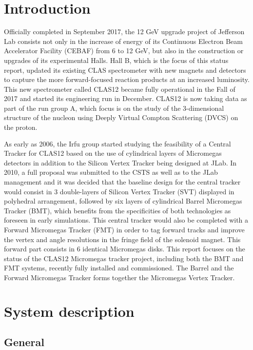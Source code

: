 \section{Introduction}
Officially completed in September 2017, the 12 GeV upgrade project of Jefferson Lab consists not only in the increase of energy of its Continuous Electron Beam Accelerator Facility (CEBAF) from 6 to 12 GeV, but also in the construction or upgrades of its experimental Halls. Hall B, which is the focus of this status report, updated its existing CLAS spectrometer with new magnets and detectors to capture the more forward-focused reaction products at an increased luminosity. This new spectrometer called CLAS12 became fully operational in the Fall of 2017 and started its engineering run in December. CLAS12 is now taking data as part of the run group A, which focus is on the study of the 3-dimensional structure of the nucleon using Deeply Virtual Compton Scattering (DVCS) on the proton.

As early as 2006, the Irfu group started studying the feasibility of a Central Tracker for CLAS12 based on the use of cylindrical layers of Micromegas detectors in addition to the Silicon Vertex Tracker being designed at JLab. In 2010, a full proposal was submitted to the CSTS as well as to the JLab management and it was decided that the baseline design for the central tracker would consist in 3 double-layers of Silicon Vertex Tracker (SVT) displayed in polyhedral arrangement, followed by six layers of cylindrical Barrel Micromegas Tracker (BMT), which benefits from the specificities of both technologies as foreseen in early simulations. This central tracker would also be completed with a Forward Micromegas Tracker (FMT) in order to tag forward tracks and improve the vertex and angle resolutions in the fringe field of the solenoid magnet. This forward part consists in 6 identical Micromegas disks. This report focuses on the status of the CLAS12 Micromegas tracker project, including both the BMT and FMT systems, recently fully installed and commissioned. The Barrel and the Forward Micromegas Tracker forms together the Micromegas Vertex Tracker.

\section{System description}

\subsection{General}


